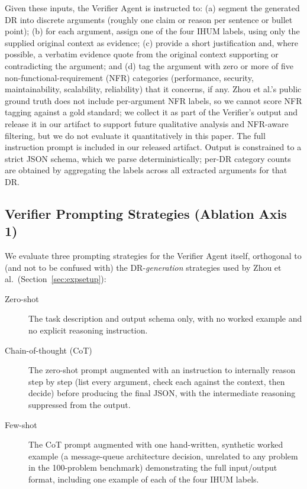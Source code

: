 \documentclass[runningheads]{llncs}
\begin{document}
Given these inputs, the Verifier Agent is instructed to: (a) segment the generated DR into discrete arguments (roughly one claim or reason per sentence or bullet point); (b) for each argument, assign one of the four IHUM labels, using only the supplied original context as evidence; (c) provide a short justification and, where possible, a verbatim evidence quote from the original context supporting or contradicting the argument; and (d) tag the argument with zero or more of five non-functional-requirement (NFR) categories (performance, security, maintainability, scalability, reliability) that it concerns, if any. Zhou et al.'s public ground truth does not include per-argument NFR labels, so we cannot score NFR tagging against a gold standard; we collect it as part of the Verifier's output and release it in our artifact to support future qualitative analysis and NFR-aware filtering, but we do not evaluate it quantitatively in this paper. The full instruction prompt is included in our released artifact. Output is constrained to a strict JSON schema, which we parse deterministically; per-DR category counts are obtained by aggregating the labels across all extracted arguments for that DR.

\subsection{Verifier Prompting Strategies (Ablation Axis 1)}
We evaluate three prompting strategies for the Verifier Agent itself, orthogonal to (and not to be confused with) the DR-\emph{generation} strategies used by Zhou et al.\ (Section~\ref{sec:expsetup}):
\begin{description}
\item[Zero-shot] The task description and output schema only, with no worked example and no explicit reasoning instruction.
\item[Chain-of-thought (CoT)] The zero-shot prompt augmented with an instruction to internally reason step by step (list every argument, check each against the context, then decide) before producing the final JSON, with the intermediate reasoning suppressed from the output.
\item[Few-shot] The CoT prompt augmented with one hand-written, synthetic worked example (a message-queue architecture decision, unrelated to any problem in the 100-problem benchmark) demonstrating the full input/output format, including one example of each of the four IHUM labels.
\end{description}
\end{document}
